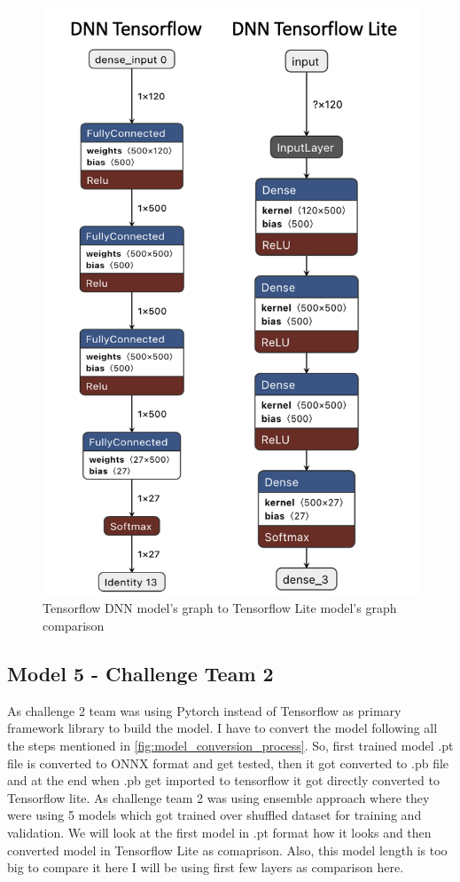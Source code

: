 \begin{figure}[H]
\centering
\includegraphics[scale=0.7]{img/dnn_conversion_comparison.png}
\caption{Tensorflow DNN model's graph to Tensorflow Lite model's graph comparison}
\label{dnn_conversion_comparison}
\end{figure}


\subsection{Model 5 - Challenge Team 2}\label{5CTLM5}

As challenge 2 team was using Pytorch instead of Tensorflow as primary framework library to build the model. I have to convert the model following all the steps mentioned in \ref{fig:model_conversion_process}. So, first trained model .pt file is converted to ONNX format and get tested, then it got converted to .pb file and at the end when .pb get imported to tensorflow it got directly converted to Tensorflow lite. As challenge team 2 was using ensemble approach where they were using 5 models which got trained over shuffled dataset for training and validation. We will look at the first model in .pt format how it looks and then converted model in Tensorflow Lite as comaprison. Also, this model length is too big to compare it here I will be using first few layers as comparison here. 

